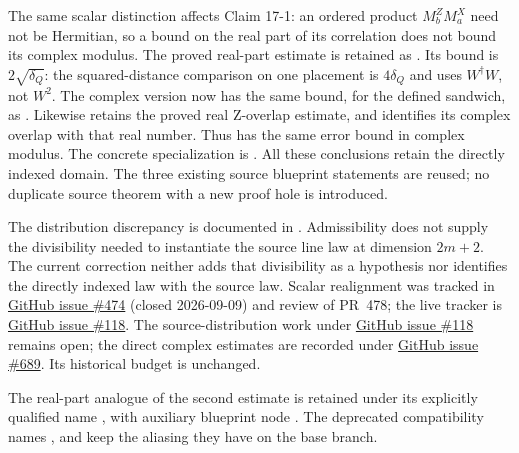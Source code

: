 \documentclass[11pt]{article}
\renewcommand{\ghissue}[1]{%
  \href{https://github.com/Dengnifer/MIPStarRE-A/issues/#1}{GitHub issue \##1}}
\begin{document}
The same scalar distinction affects Claim 17-1: an ordered product
$M^Z_bM^X_a$ need not be Hermitian, so a bound on the real part of its
correlation does not bound its complex modulus. The proved real-part
estimate is retained as
.
Its bound is $2\sqrt{\delta_Q}$: the squared-distance comparison on
one placement is $4\delta_Q$ and uses $W^\dagger W$, not $W^2$.
The complex version now has the same bound, for the defined sandwich, as
.
Likewise  retains the
proved real Z-overlap estimate, and
 identifies its complex
overlap with that real number. Thus
 has the same error bound
in complex modulus. The concrete specialization is
.
All these conclusions retain the directly indexed domain.
The three existing source blueprint statements are reused; no duplicate
source theorem with a new proof hole is introduced.

The distribution discrepancy is documented in
. Admissibility
does not supply the divisibility needed to instantiate the source line law
at dimension $2m+2$. The current correction neither adds that divisibility
as a hypothesis nor identifies the directly indexed law with the source law.
Scalar realignment was tracked in \ghissue{474} (closed 2026-09-09) and
review of PR~478; the live tracker is \ghissue{118}.
The source-distribution work under \ghissue{118} remains open;
the direct complex estimates are recorded under \ghissue{689}.
Its historical budget is unchanged.

The real-part analogue of the second estimate is retained under its
explicitly qualified name ,
with auxiliary blueprint node . The
deprecated compatibility names ,
 and 
keep the aliasing they have on the base branch.
\end{document}
